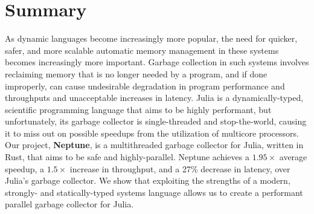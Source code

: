 \section{Summary} \label{summary}
As dynamic languages become increasingly more popular, the need for quicker, safer, and more scalable automatic memory management in these systems becomes increasingly more important.
Garbage collection in such systems involves reclaiming memory that is no longer needed by a program, and if done improperly, can cause undesirable degradation in program performance and throughputs and unacceptable increases in latency.
Julia is a dynamically-typed, scientific programming language that aims to be highly performant, but unfortunately, its garbage collector is single-threaded and stop-the-world, causing it to miss out on possible speedups from the utilization of multicore processors.
Our project, \textbf{Neptune}, is a multithreaded garbage collector for Julia, written in Rust, that aims to be safe and highly-parallel.
Neptune achieves a $1.95\times$ average speedup, a $1.5\times$ increase in throughput, and a 27\% decrease in latency, over Julia's garbage collector.
We show that exploiting the strengths of a modern, strongly- and statically-typed systems language allows us to create a performant parallel garbage collector for Julia.

